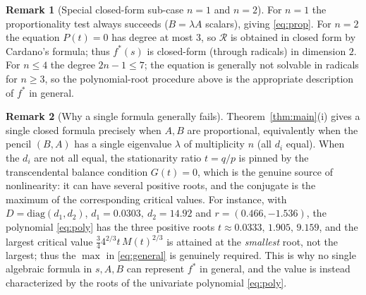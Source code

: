 \documentclass{amsart}
\theoremstyle{definition}
\newtheorem{remark}{Remark}
\begin{document}
\begin{remark}[Special closed-form sub-case $n=1$ and $n=2$]
For $n=1$ the proportionality test always succeeds ($B=\lambda A$ scalars), giving \eqref{eq:prop}. For $n=2$ the equation $P(t)=0$ has degree at most $3$, so $\mathcal R$ is obtained in closed form by Cardano's formula; thus $f^*(s)$ is closed-form (through radicals) in dimension $2$. For $n\le 4$ the degree $2n-1\le 7$; the equation is generally not solvable in radicals for $n\ge3$, so the polynomial-root procedure above is the appropriate description of $f^*$ in general.
\end{remark}

\begin{remark}[Why a single formula generally fails]
Theorem~\ref{thm:main}(i) gives a single closed formula precisely when $A,B$ are proportional, equivalently when the pencil $(B,A)$ has a single eigenvalue $\lambda$ of multiplicity $n$ (all $d_i$ equal). When the $d_i$ are not all equal, the stationarity ratio $t=q/p$ is pinned by the transcendental balance condition $G(t)=0$, which is the genuine source of nonlinearity: it can have several positive roots, and the conjugate is the maximum of the corresponding critical values. For instance, with $D=\mathrm{diag}(d_1,d_2)$, $d_1=0.0303,\ d_2=14.92$ and $r=(0.466,-1.536)$, the polynomial \eqref{eq:poly} has the three positive roots $t\approx0.0333,\,1.905,\,9.159$, and the largest critical value $\tfrac34 4^{2/3}t\,M(t)^{2/3}$ is attained at the \emph{smallest} root, not the largest; thus the $\max$ in \eqref{eq:general} is genuinely required. This is why no single algebraic formula in $s,A,B$ can represent $f^*$ in general, and the value is instead characterized by the roots of the univariate polynomial \eqref{eq:poly}.
\end{remark}
\end{document}
